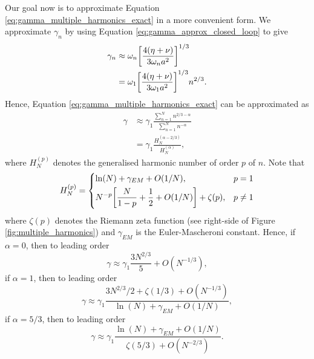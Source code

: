 Our goal now is to approximate Equation \eqref{eq:gamma_multiple_harmonics_exact} in a more convenient form. We approximate $\gamma_n$ by using Equation \eqref{eq:gamma_approx_closed_loop} to give
\begin{equation}
    \begin{aligned}
    \gamma_n &\approx \omega_n\qty[\frac{4(\eta+\nu)}{3\omega_na^2}]^{1/3} \\
    &= \omega_1\qty[\frac{4(\eta+\nu)}{3\omega_1a^2}]^{1/3}n^{2/3}.
    \end{aligned}
\end{equation}
Hence, Equation \eqref{eq:gamma_multiple_harmonics_exact} can be approximated as
\begin{equation}
    \label{eq:gamma_multiple_harmonics_approx}
    \begin{aligned}
    \gamma &\approx \gamma_1\frac{\sum_{n=1}^Nn^{2/3-\alpha}}{\sum_{n=1}^Nn^{-\alpha}} \\
    &= \gamma_1\frac{H_N^{(\alpha-2/3)}}{H_N^{(\alpha)}},
    \end{aligned}
\end{equation}
where $H_N^{(p)}$ denotes the generalised harmonic number of order $p$ of $n$.
Note that
\begin{equation}
\label{eq:generalised_harmonic_number_approx}
H_N^{(p)}=
    \begin{dcases}
    \ln(N) + \gamma_{EM} + O(1/N), & p=1 \\
    N^{-p}\qty[\frac{N}{1-p}+\frac{1}{2}+O(1/N)] + \zeta(p), & p\ne 1 \\
    \end{dcases}
\end{equation}
where $\zeta(p)$ denotes the Riemann zeta function (see right-side of Figure \ref{fig:multiple_harmonics}) and $\gamma_{EM}$ is the Euler-Mascheroni constant. Hence, 
if $\alpha=0$, then to leading order
\begin{equation}
    \label{eq:gamma_alpha=0}
    \gamma \approx \gamma_1\frac{3N^{2/3}}{5} + O(N^{-1/3}),
\end{equation}
if $\alpha = 1$, then to leading order
\begin{equation}
    \label{eq:gamma_approx_alpha=1}
    \gamma \approx \gamma_1\frac{3N^{2/3}/2+\zeta(1/3) + O(N^{-1/3})}{\ln(N)+\gamma_{EM}+O(1/N)},
\end{equation}
if $\alpha=5/3$, then to leading order
\begin{equation}
    \label{eq:gamma_alpha=5/3}
    \gamma \approx \gamma_1\frac{\ln(N) + \gamma_{EM} + O(1/N)}{\zeta(5/3)+O(N^{-2/3})}.
\end{equation}

